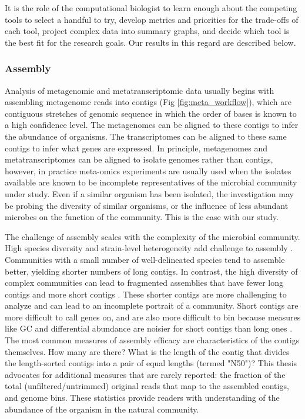 
It is the role of the computational biologist to learn enough about the competing tools to select a handful to try, develop metrics and priorities for the trade-offs of each tool, project complex data into summary graphs, and decide which tool is the best fit for the research goals.
Our results in this regard are described below.  %

\subsubsection{Assembly}
Analysis of metagenomic and metatranscriptomic data usually begins with assembling metagenome reads into contigs (Fig \ref{fig:meta_workflow}), which are contiguous stretches of genomic sequence in which the order of bases is known to a high confidence level. %
The metagenomes can be aligned to these contigs to infer the abundance of organisms.
The transcriptomes can be aligned to these same contigs to infer what genes are expressed.
In principle, metagenomes and metatranscriptomes can be aligned to isolate genomes rather than contigs, however, in practice meta-omics experiments are usually used when the isolates available are known to be incomplete representatives of the microbial community under study.
Even if a similar organism has been isolated, the investigation may be probing the diversity of similar organisms, or the influence of less abundant microbes on the function of the community.
This is the case with our study.

The challenge of assembly scales with the complexity of the microbial community.
High species diversity and strain-level heterogeneity add challenge to assembly \cite{kunin2008, thomas2012}.
Communities with a small number of well-delineated species tend to assemble better, yielding shorter numbers of long contigs.
In contrast, the high diversity of complex communities can lead to fragmented assemblies that have fewer long contigs and more short contigs \cite{kunin2008}.
These shorter contigs are more challenging to analyze and can lead to an incomplete portrait of a community.
Short contigs are more difficult to call genes on, and are also more difficult to bin because measures like GC and differential abundance are noisier for short contigs than long ones \cite{sangwan2016}.
The most common measures of assembly efficacy are characteristics of the contigs themselves.  How many are there?  What is the length of the contig that divides the length-sorted contigs into a pair of equal lengths (termed "N50")?
This thesis advocates for additional measures that are rarely reported: the fraction of the total (unfiltered/untrimmed) original reads that map to the assembled contigs, and genome bins.
These statistics provide readers with understanding of the abundance of the organism in the natural community.

